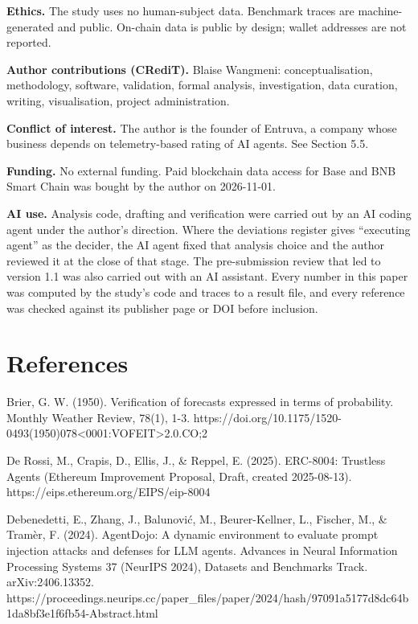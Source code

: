 \documentclass[
  11pt,
  a4paper,
]{article}
\begin{document}
\textbf{Ethics.} The study uses no human-subject data. Benchmark traces
are machine-generated and public. On-chain data is public by design;
wallet addresses are not reported.

\textbf{Author contributions (CRediT).} Blaise Wangmeni:
conceptualisation, methodology, software, validation, formal analysis,
investigation, data curation, writing, visualisation, project
administration.

\textbf{Conflict of interest.} The author is the founder of Entruva, a
company whose business depends on telemetry-based rating of AI agents.
See Section 5.5.

\textbf{Funding.} No external funding. Paid blockchain data access for
Base and BNB Smart Chain was bought by the author on 2026-11-01.

\textbf{AI use.} Analysis code, drafting and verification were carried
out by an AI coding agent under the author's direction. Where the
deviations register gives ``executing agent'' as the decider, the AI
agent fixed that analysis choice and the author reviewed it at the close
of that stage. The pre-submission review that led to version 1.1 was
also carried out with an AI assistant. Every number in this paper was
computed by the study's code and traces to a result file, and every
reference was checked against its publisher page or DOI before
inclusion.

\hypertarget{references}{%
\section*{References}\label{references}}

\begingroup\small\setlength{\parindent}{-1.5em}\setlength{\leftskip}{1.5em}\setlength{\parskip}{3pt}

Brier, G. W. (1950). Verification of forecasts expressed in terms of
probability. Monthly Weather Review, 78(1), 1-3.
https://doi.org/10.1175/1520-0493(1950)078\textless0001:VOFEIT\textgreater2.0.CO;2

De Rossi, M., Crapis, D., Ellis, J., \& Reppel, E. (2025). ERC-8004:
Trustless Agents (Ethereum Improvement Proposal, Draft, created
2025-08-13). https://eips.ethereum.org/EIPS/eip-8004

Debenedetti, E., Zhang, J., Balunović, M., Beurer-Kellner, L., Fischer,
M., \& Tramèr, F. (2024). AgentDojo: A dynamic environment to evaluate
prompt injection attacks and defenses for LLM agents. Advances in Neural
Information Processing Systems 37 (NeurIPS 2024), Datasets and
Benchmarks Track. arXiv:2406.13352.
https://proceedings.neurips.cc/paper\_files/paper/2024/hash/97091a5177d8dc64b1da8bf3e1f6fb54-Abstract.html
\end{document}
